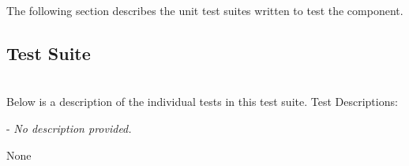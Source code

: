 The following section describes the unit test suites written to test the component.

\subsection{\textit{} Test Suite}

 \\

Below is a description of the individual tests in this test suite.
\vspace{5mm} %
Test Descriptions:
\begin{spaceditemize}
  \item \textbf{\texttt{}} -
    \textit{No description provided.}
\end{spaceditemize}
\vspace{5mm} %

None



